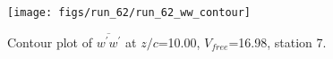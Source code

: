 \begin{figure}[H]
\centering
\texttt{[image: figs/run\_62/run\_62\_ww\_contour]}
\caption{Contour plot of $\overline{w^\prime w^\prime}$ at $z/c$=10.00, $V_{free}$=16.98, station 7.}
\label{fig:run_62_ww_contour}
\end{figure}


